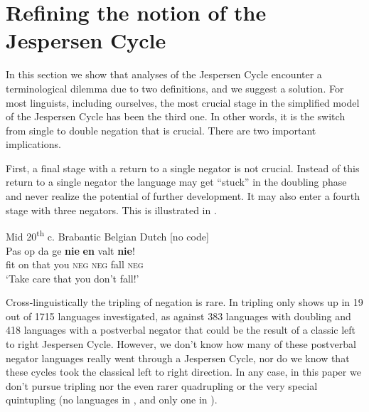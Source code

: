 ﻿\documentclass[output=paper]{langsci/langscibook}
\begin{document}
\section{Refining the notion of the Jespersen Cycle}\label{sec:int-2}

In this section we show that analyses of the Jespersen Cycle encounter a
terminological dilemma due to two definitions, and we suggest a solution.
For most linguists, including ourselves, the most crucial stage in the
simplified model of the Jespersen Cycle has been the third one. In other
words, it is the switch from single to double negation that is crucial.
There are two important implications.

First, a final stage with a return to a single negator is not crucial.
Instead of this return to a single negator the language may get ``stuck''
in the doubling phase and never realize the potential of further
development. It may also enter a fourth stage with three negators. This
is illustrated in .
%
\begin{exe}\ex \label{ex:int-brabantic}
          Mid 20\textsuperscript{th} c. Brabantic Belgian Dutch [no code]
\\
\gll Pas op da ge \textbf{nie} \textbf{en} valt \textbf{nie}! \\
fit  on  that  you  \textsc{neg} \textsc{neg}  fall  \textsc{neg} \\
    \glt `Take care that you don't fall!'  
    \end{exe}
%
Cross-linguistically the tripling of negation is rare. In
\textcite[344]{Vossen2016} tripling only shows up in 19 out of 1715 languages
investigated, as against 383 languages with doubling and 418 languages with
a postverbal negator that could be the result of a classic left to right
Jespersen Cycle. However, we don't know how many of these postverbal
negator languages really went through a Jespersen Cycle, nor do we know
that these cycles took the classical left to right direction. In any case,
in this paper we don't pursue tripling \parencite[see][]{DevosAuwera2013}
nor the even rarer quadrupling \parencite[only 3 languages
in][343]{Vossen2016}  or the very special quintupling 
(no languages in \citealt[][]{Vossen2016}, and only one in 
\citealt[42]{AuweraVossen2017}).
\end{document}
